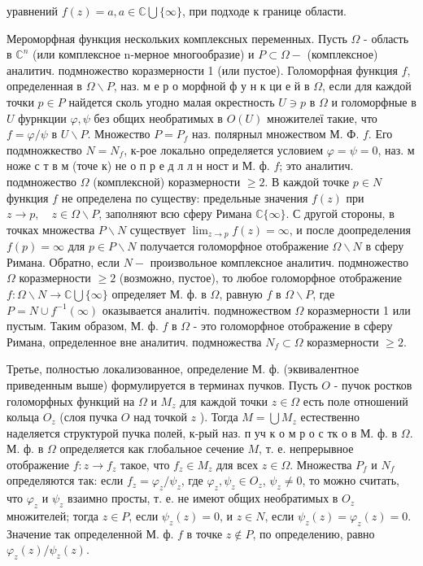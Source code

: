 \documentclass[10pt]{article}
\begin{document}
уравнений $f(z)=a, a \in \mathbb{C} \bigcup\{\infty\}$, при подходе к границе области.



Мероморфная функция нескольких комплексных переменных. Пусть $\Omega$ - область в $\mathbb{C}^{n}$ (или комплексное n-мерное многообразие) и $P \subset \Omega-$ (комплексное) аналитич. подмножество коразмерности 1 (или пустое). Голоморфная функция $f$, определенная в $\Omega \backslash P$, наз. м е р о морфной ф у н к ци е й в $\Omega$, если для каждой точки $p \in P$ найдется сколь угодно малая окрестность $U \ni p$ в $\Omega$ и голоморфные в $U$ фурнкции $\varphi, \psi$ без общих необратимых в $O(U)$ множителеї такие, что $f=\varphi / \psi$ в $U \backslash P$. Множество $P=P_{f}$ наз. полярныл множеством М. Ф. $f$. Его подмножкество $N=N_{f}$, к-рое локально определяется условием $\varphi=\psi=0$, наз. м ноже с т в м (точе к) не о п р е д л л н ност и М. ф. $f$; это аналитич. подмножество $\Omega$ (комплексной) коразмерности $\geqslant 2$. В каждой точке $p \in N$ функция $f$ не определена по существу: предельные значения $f(z)$ при $z \rightarrow p, \quad z \in \Omega \backslash P$, заполняют всю сферу Римана $\mathbb{C}\{\infty\}$. С другой стороны, в точках множества $P \backslash N$ существует $\lim _{z \rightarrow p} f(z)=\infty$, и после доопределения $f(p)=\infty$ для $p \in P \backslash N$ получается голоморфное отображение $\Omega \backslash N$ в сферу Римана. Обратно, если $N-$ произвольное комплексное аналитич. подмножество $\Omega$ коразмерности $\geqslant 2$ (возможно, пустое), то любое голоморфное отображение $f: \Omega \backslash N \rightarrow \mathbb{C} \bigcup\{\infty\}$ определяет М. ф. в $\Omega$, равную $f$ в $\Omega \backslash P$, где $P=N \cup f^{-1}(\infty)$ оказывается аналитіч. подмножеством $\Omega$ коразмерности 1 или пустым. Таким образом, М. ф. $f$ в $\Omega$ - это голоморфное отображение в сферу Римана, определенное вне аналитич. подмножества $N_{f} \subset \Omega$ коразмерности $\geqslant 2$.



Третье, полностью локализованное, определение М. ф. (эквивалентное приведенным выше) формулируется в терминах пучков. Пусть $O$ - пучок ростков голоморфных функций на $\Omega$ и $M_{z}$ для каждой точки $z \in \Omega$ есть поле отношений кольца $O_{z}$ (слоя пучка $O$ над точкой $z$ ). Тогда $M=\bigcup M_{z}$ естественно наделяется структурой пучка полей, к-рый наз. п уч к о м р о с тк о в М. ф. в $\Omega$. М. ф. в $\Omega$ определяется как глобальное сечение $M$, т. е. непрерывное отображение $f: z \rightarrow f_{z}$ такое, что $f_{z} \in M_{z}$ для всех $z \in \Omega$. Множества $P_{f}$ и $N_{f}$ определяются так: если $f_{z}=\varphi_{z} / \psi_{z}$, где $\varphi_{z}, \psi_{z} \in O_{z}$, $\psi_{z} \neq 0$, то можно считать, что $\varphi_{z}$ и $\psi_{z}$ взаимно просты, т. е. не имеют общих необратимых в $O_{z}$ множителей; тогда $z \in P$, если $\psi_{z}(z)=0$, и $z \in N$, если $\psi_{z}(z)=\varphi_{z}(z)=0$. Значение так определенной М. ф. $f$ в точке $z \notin P$, по определению, равно $\varphi_{z}(z) / \psi_{z}(z)$.
\end{document}
